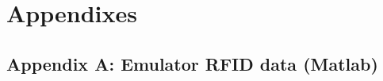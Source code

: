\section{Appendixes}

\subsection{Appendix A: Emulator RFID data (Matlab)}\label{Sec_AppA}
\scriptsize


